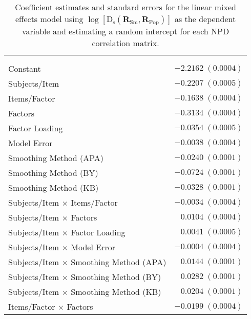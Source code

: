 \documentclass[
  english,
  man]{apa6}
\begin{document}
\begin{center}
\begin{longtable}{l r }
\caption{Coefficient estimates and standard errors for the linear mixed effects model using $\log[\mathrm{D}_{\mathrm{s}}(\mathbf{R}_{\textrm{Sm}}, \mathbf{R}_{\textrm{Pop}})]$ as the dependent variable and estimating a random intercept for each NPD correlation matrix.}
\label{tab:distance-mod-summary}\\
\hline
 &  \\
\hline
\endfirsthead
\hline
 &  \\
\hline
\endhead
\hline
\endfoot
\hline
\\
\endlastfoot
Constant                                       & $-2.2162 \; (0.0004)$ \\
Subjects/Item                                  & $-0.2207 \; (0.0005)$ \\
Items/Factor                                   & $-0.1638 \; (0.0004)$ \\
Factors                                        & $-0.3134 \; (0.0004)$ \\
Factor Loading                                 & $-0.0354 \; (0.0005)$ \\
Model Error                                    & $-0.0038 \; (0.0004)$ \\
Smoothing Method (APA)                         & $-0.0240 \; (0.0001)$ \\
Smoothing Method (BY)                          & $-0.0724 \; (0.0001)$ \\
Smoothing Method (KB)                          & $-0.0328 \; (0.0001)$ \\
Subjects/Item $\times$ Items/Factor            & $-0.0034 \; (0.0004)$ \\
Subjects/Item $\times$ Factors                 & $0.0104 \; (0.0004)$  \\
Subjects/Item $\times$ Factor Loading          & $0.0041 \; (0.0005)$  \\
Subjects/Item $\times$ Model Error             & $-0.0004 \; (0.0004)$ \\
Subjects/Item $\times$ Smoothing Method (APA)  & $0.0144 \; (0.0001)$  \\
Subjects/Item $\times$ Smoothing Method (BY)   & $0.0282 \; (0.0001)$  \\
Subjects/Item $\times$ Smoothing Method (KB)   & $0.0204 \; (0.0001)$  \\
Items/Factor $\times$ Factors                  & $-0.0199 \; (0.0004)$ \\

\end{longtable}
\end{center}
\end{document}
